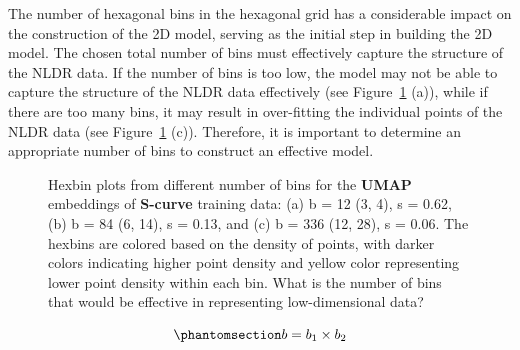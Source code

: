\documentclass[
  12pt]{article}
\begin{document}
The number of hexagonal bins in the hexagonal grid has a considerable
impact on the construction of the 2D model, serving as the initial step
in building the 2D model. The chosen total number of bins must
effectively capture the structure of the NLDR data. If the number of
bins is too low, the model may not be able to capture the structure of
the NLDR data effectively (see Figure~\ref{fig-binsize} (a)), while if
there are too many bins, it may result in over-fitting the individual
points of the NLDR data (see Figure~\ref{fig-binsize} (c)). Therefore,
it is important to determine an appropriate number of bins to construct
an effective model.

\begin{figure}[H]


\caption{\label{fig-binsize}Hexbin plots from different number of bins
for the \textbf{UMAP} embeddings of \textbf{S-curve} training data: (a)
b = 12 (3, 4), s = 0.62, (b) b = 84 (6, 14), s = 0.13, and (c) b = 336
(12, 28), s = 0.06. The hexbins are colored based on the density of
points, with darker colors indicating higher point density and yellow
color representing lower point density within each bin. What is the
number of bins that would be effective in representing low-dimensional
data?}

\end{figure}%

\begin{equation}\phantomsection\label{eq-equation8}{
b = b_1 \times b_2
}\end{equation}
\end{document}
